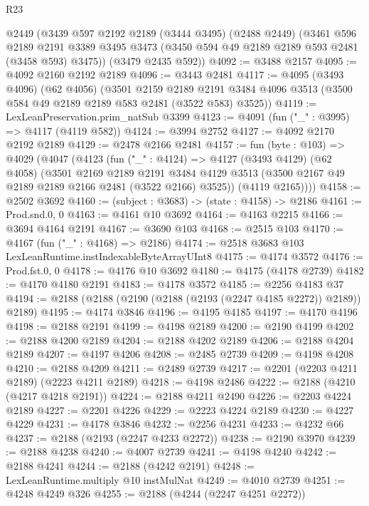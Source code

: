\begin{lexlean}{R23}
\begin{coremodule}
    @2449
    (@3439
      @597
      @2192
      @2189
      (@3444 @3495)
      (@2488 @2449)
      (@3461
        @596
        @2189
        @2191
        @3389
        @3495
        @3473
        (@3450 @594 @49 @2189 @2189 @593 @2481 (@3458 @593) @3475))
      (@3479 @2435 @592))
@4092 := @3488 @2157
@4095 := @4092 @2160 @2192 @2189
@4096 := @3443 @2481
@4117 := @4095
    (@3493 @4096)
    (@62 @4056)
    (@3501
      @2159
      @2189
      @2191
      @3484
      @4096
      @3513
      (@3500 @584 @49 @2189 @2189 @583 @2481 (@3522 @583) @3525))
@4119 := LexLeanPreservation.prim_natSub @3399
@4123 := @4091 (fun ("_" : @3995) => @4117 (@4119 @582))
@4124 := @3994 @2752
@4127 := @4092 @2170 @2192 @2189
@4129 := @2478 @2166 @2481
@4157 := fun (byte : @103) =>
  @4029
    (@4047
      (@4123
        (fun ("_" : @4124) =>
        @4127
          (@3493 @4129)
          (@62 @4058)
          (@3501
            @2169
            @2189
            @2191
            @3484
            @4129
            @3513
            (@3500 @2167 @49 @2189 @2189 @2166 @2481 (@3522 @2166) @3525))
          (@4119 @2165))))
@4158 := @2502 @3692
@4160 := (subject : @3683) -> (state : @4158) -> @2186
@4161 := Prod.snd.{0, 0}
@4163 := @4161 @10 @3692
@4164 := @4163 @2215
@4166 := @3694 @4164 @2191
@4167 := @3690 @103
@4168 := @2515 @103
@4170 := @4167 (fun ("_" : @4168) => @2186)
@4174 := @2518 @3683 @103 LexLeanRuntime.instIndexableByteArrayUInt8
@4175 := @4174 @3572
@4176 := Prod.fst.{0, 0}
@4178 := @4176 @10 @3692
@4180 := @4175 (@4178 @2739)
@4182 := @4170 @4180 @2191
@4183 := @4178 @3572
@4185 := @2256 @4183 @37
@4194 := @2188 (@2188 (@2190 (@2188 (@2193 (@2247 @4185 @2272)) @2189)) @2189)
@4195 := @4174 @3846
@4196 := @4195 @4185
@4197 := @4170 @4196
@4198 := @2188 @2191
@4199 := @4198 @2189
@4200 := @2190 @4199
@4202 := @2188 @4200 @2189
@4204 := @2188 @4202 @2189
@4206 := @2188 @4204 @2189
@4207 := @4197 @4206
@4208 := @2485 @2739
@4209 := @4198 @4208
@4210 := @2188 @4209
@4211 := @2489 @2739
@4217 := @2201 (@2203 @4211 @2189) (@2223 @4211 @2189)
@4218 := @4198 @2486
@4222 := @2188 (@4210 (@4217 @4218 @2191))
@4224 := @2188 @4211 @2490
@4226 := @2203 @4224 @2189
@4227 := @2201 @4226
@4229 := @2223 @4224 @2189
@4230 := @4227 @4229
@4231 := @4178 @3846
@4232 := @2256 @4231
@4233 := @4232 @66
@4237 := @2188 (@2193 (@2247 @4233 @2272))
@4238 := @2190 @3970
@4239 := @2188 @4238
@4240 := @4007 @2739
@4241 := @4198 @4240
@4242 := @2188 @4241
@4244 := @2188 (@4242 @2191)
@4248 := LexLeanRuntime.multiply @10 instMulNat
@4249 := @4010 @2739
@4251 := @4248 @4249 @326
@4255 := @2188 (@4244 (@2247 @4251 @2272))

\end{coremodule}
\end{lexlean}
